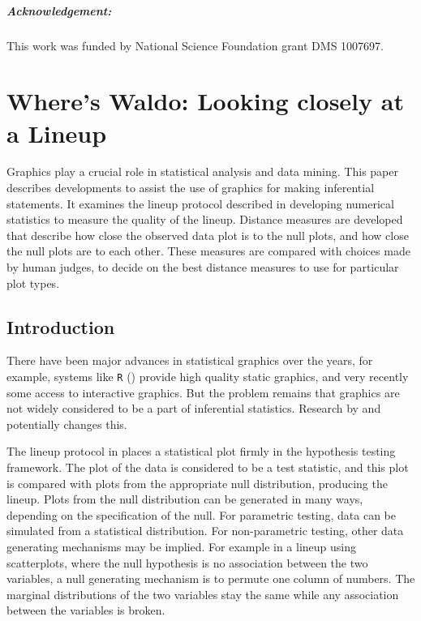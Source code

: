 \documentclass[12]{report}
\begin{document}
\paragraph{Acknowledgement:}
%
This work was funded by National Science Foundation grant DMS 1007697.


\chapter{Where's Waldo: Looking closely at a Lineup} \label{ch:waldo} Graphics play a crucial role in statistical analysis and data mining. This paper describes developments to assist the use of graphics for making inferential statements. It examines the lineup protocol described in \citet{buja:2009}  
  developing numerical statistics to measure the quality of the lineup. Distance measures are developed that describe how close the observed data plot is to the null plots, and how close the null plots are to each other. These measures are compared with choices made by human judges, to decide on the best distance measures to use for particular plot types.

\section{Introduction} 
There have been major advances in statistical graphics over the years, for example, systems like \texttt{R} (\cite{r}) provide high quality static graphics, and very recently some access to interactive graphics. But the problem remains that graphics are not widely considered to be a part of inferential statistics. Research by \citet{gelman:2004} and \citet{buja:2009} 
potentially changes this. 

The lineup protocol in \citep{buja:2009} 
places a statistical plot firmly in the hypothesis testing framework. The plot of the data is considered to be a test statistic, and this plot is compared with plots from the appropriate null distribution, producing the lineup. Plots from the null distribution can be generated in many ways, depending on the specification of the null. For parametric testing, data can be simulated from a statistical distribution. For non-parametric testing, other data generating mechanisms may be implied. For example in a lineup using scatterplots, where the null hypothesis is no association between the two variables,  a null generating mechanism is to permute one column of numbers. The marginal distributions of the two variables stay the same while any association between the variables is broken. 
\end{document}
